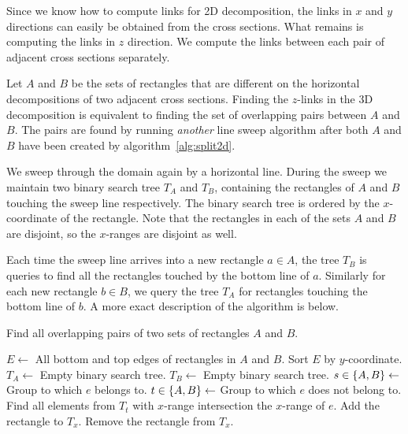 \documentclass[english,gradu]{tktltiki2018}
\begin{document}
Since we know how to compute links for 2D decomposition, the links in $x$ and $y$ directions can easily be obtained from the cross sections.
What remains is computing the links in $z$ direction.
We compute the links between each pair of adjacent cross sections separately.

Let $A$ and $B$ be the sets of rectangles that are different on the horizontal decompositions of two adjacent cross sections.
Finding the $z$-links in the 3D decomposition is equivalent to finding the set of overlapping pairs between $A$ and $B$.
The pairs are found by running \emph{another} line sweep algorithm after both $A$ and $B$ have been created by algorithm~\ref{alg:split2d}.

We sweep through the domain again by a horizontal line.
During the sweep we maintain two binary search tree $T_A$ and $T_B$, containing the rectangles of $A$ and $B$ touching the sweep line respectively.
The binary search tree is ordered by the $x$-coordinate of the rectangle.
Note that the rectangles in each of the sets $A$ and $B$ are disjoint, so the $x$-ranges are disjoint as well.

Each time the sweep line arrives into a new rectangle $a\in A$, the tree $T_B$ is queries to find all the rectangles touched by the bottom line of $a$.
Similarly for each new rectangle $b\in B$, we query the tree $T_A$ for rectangles touching the bottom line of $b$.
A more exact description of the algorithm is below.

\begin{alg}\label{alg:overlap2d}
Find all overlapping pairs of two sets of rectangles $A$ and $B$.
\begin{algorithmic}
\State $E\gets$ All bottom and top edges of rectangles in $A$ and $B$.
\State Sort $E$ by $y$-coordinate.
\State $T_A\gets$ Empty binary search tree.
\State $T_B\gets$ Empty binary search tree.
	\State $s\in\left\{A,B\right\}\gets$ Group to which $e$ belongs to.
	\State $t\in\left\{A,B\right\}\gets$ Group to which $e$ does not belong to.
		\State Find all elements from $T_t$ with $x$-range intersection the $x$-range of $e$.
		\State Add the rectangle to $T_x$.
	\Else
		\State Remove the rectangle from $T_x$.
	\EndIf
\EndFor
\end{algorithmic}
\end{alg}
\end{document}
